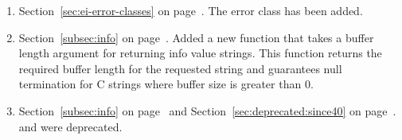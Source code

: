\begin{enumerate}
\item
  Section~\ref{sec:ei-error-classes} on page~\pageref{table:inquiry:errclasses:part:i}.
  \newline
  The error class  has been added.

\item
Section~\ref{subsec:info} on page~\pageref{subsec:info}.
\newline
Added a new function  that takes a
buffer length argument for returning info value strings. This function
returns the required buffer length for the requested string and guarantees
null termination for C strings where buffer size is greater than 0.

\item
Section~\ref{subsec:info} on page~\pageref{subsec:info} and
Section~\ref{sec:deprecated:since40} on page~\pageref{sec:deprecated:since40}.
\newline
{} and  were deprecated.
  

\end{enumerate}
